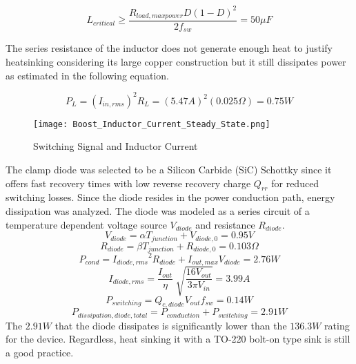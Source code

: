 \begin{equation}
 L_{critical} \ge \frac{R_{load,maxpower}D(1-D)^2}{2f_{sw}}= 50 \mu F
\label{Lcrit Eq}
\end{equation}

The series resistance of the inductor does not generate enough heat to justify heatsinking considering its large copper construction but it still dissipates power as estimated in the following equation.

\begin{equation}
P_L = (I_{in,rms})^2R_L = (5.47A)^2(0.025\Omega) = 0.75W 
\end{equation}

\begin{figure}
\centering
\texttt{[image: Boost\_Inductor\_Current\_Steady\_State.png]}
\caption{Switching Signal and Inductor Current}
\label{inductorCurrent}
\end{figure}


The clamp diode was selected to be a Silicon Carbide (SiC) Schottky since it offers fast recovery times with low reverse recovery charge $Q_{rr}$ for reduced switching losses. Since the diode resides in the power conduction path, energy dissipation was analyzed. The diode was modeled as a series circuit of a temperature dependent voltage source $ V_{diode}$ and resistance $R_{diode}$.\cite{CREE}
\begin{equation}
 V_{diode} = \alpha T_{junction}+V_{diode,0} =  0.95V 
\end{equation}
\begin{equation}
 R_{diode} = \beta T_{junction}+R_{diode,0} = 0.103\Omega
\end{equation}
\begin{equation}
 P_{cond} = {I_{diode,rms}}^2R_{diode}+I_{out,max}V_{diode} = 2.76W
\end{equation}
\begin{equation}
 I_{diode,rms} = \frac{I_{out}}{\eta} \sqrt[]{ \frac{16V_{out}}{3 \pi V_{in}}}= 3.99A
\end{equation}
\begin{equation}
P_{switching} = Q_{c,diode}V_{out}f_{sw}=0.14W
\end{equation}
\begin{equation}
 P_{dissipation,diode,total}= P_{conduction}+P_{switching}=2.91W 
\end{equation}
The $2.91W$ that the diode dissipates is significantly lower than the $136.3W$ rating for the device. Regardless, heat sinking it with a TO-220 bolt-on type sink is still a good practice.


